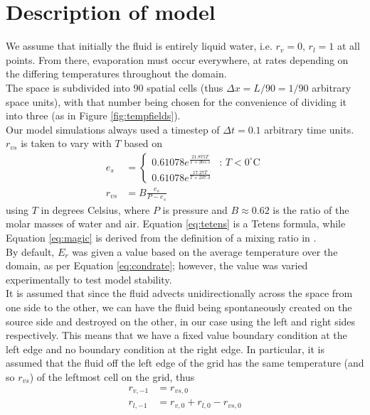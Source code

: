 \documentclass[11pt]{article}
\begin{document}
\section{Description of model}
We assume that initially the fluid is entirely liquid water, i.e. $r_v = 0$, $r_l = 1$ at all points. From there, evaporation must occur everywhere, at rates depending on the differing temperatures throughout the domain. \\
The space is subdivided into 90 spatial cells (thus $\Delta x=L/90=1/90$ arbitrary space units), with that number being chosen for the convenience of dividing it into three (as in Figure \ref{fig:tempfields}). \\
Our model simulations always used a timestep of $\Delta t=0.1$ arbitrary time units. \\
$r_{vs}$ is taken to vary with $T$ based on
\begin{align}
e_s &= \begin{cases}
0.61078 e^{\frac{21.875T}{T+265.5}} & \text{: $T<0^{\circ}$C} \\
0.61078 e^{\frac{17.27T}{T+237.3}} &
\end{cases} \label{eq:tetens} \\
r_{vs} &= B\frac{e_s}{P-e_s} \label{eq:magic}
\end{align}
using $T$ in degrees Celsius, where $P$ is pressure and $B\approx0.62$ is the ratio of the molar masses of water and air. Equation \ref{eq:tetens} is a Tetens formula, while Equation \ref{eq:magic} is derived from the definition of a mixing ratio in \citet[p.~100]{Ambaum2010}. \\
By default, $E_r$ was given a value based on the average temperature over the domain, as per Equation \ref{eq:condrate}; however, the value was varied experimentally to test model stability. \\
It is assumed that since the fluid advects unidirectionally across the space from one side to the other, we can have the fluid being spontaneously created on the source side and destroyed on the other, in our case using the left and right sides respectively. This means that we have a fixed value boundary condition at the left edge and no boundary condition at the right edge. In particular, it is assumed that the fluid off the left edge of the grid has the same temperature (and so $r_{vs}$) of the leftmost cell on the grid, thus
\begin{align}
r_{v,-1} &= r_{vs,0} \label{eq:a} \\
r_{l,-1} &= r_{v,0}+r_{l,0}-r_{vs,0} \label{eq:b}
\end{align}
\end{document}
